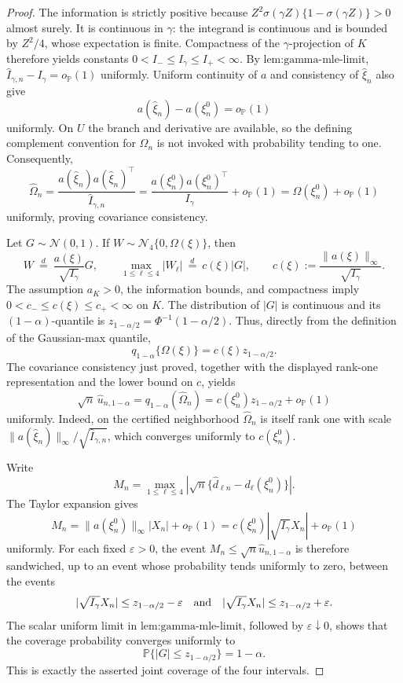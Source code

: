 \documentclass{article}
\begin{document}
\begin{proof}
The information is strictly positive because \(Z^2\sigma(\gamma Z)\{1-\sigma(\gamma Z)\}>0\) almost surely.  It is continuous in \(\gamma\): the integrand is continuous and is bounded by \(Z^2/4\), whose expectation is finite.  Compactness of the \(\gamma\)-projection of \(K\) therefore yields constants \(0<I_-\le I_\gamma\le I_+<\infty\).  By \(\text{lem:gamma-mle-limit}\), \(\widehat I_{\gamma,n}-I_\gamma=o_{\mathbb P}(1)\) uniformly.  Uniform continuity of \(a\) and consistency of \(\widehat\xi_n\) also give
\[
 a(\widehat\xi_n)-a(\xi_n^0)=o_{\mathbb P}(1)
\]
uniformly.  On \(U\) the branch and derivative are available, so the defining complement convention for \(\widehat\Omega_n\) is not invoked with probability tending to one.  Consequently,
\[
 \widehat\Omega_n
 =\frac{a(\widehat\xi_n)a(\widehat\xi_n)^\top}
        {\widehat I_{\gamma,n}}
 =\frac{a(\xi_n^0)a(\xi_n^0)^\top}{I_\gamma}
   +o_{\mathbb P}(1)
 =\Omega(\xi_n^0)+o_{\mathbb P}(1)
\]
uniformly, proving covariance consistency.

Let \(G\sim\mathcal N(0,1)\).  If \(W\sim\mathcal N_4\{0,\Omega(\xi)\}\), then
\[
 W\ \stackrel{d}{=}\ \frac{a(\xi)}{\sqrt{I_\gamma}}G,
 \qquad
 \max_{1\le\ell\le4}|W_\ell|
 \ \stackrel{d}{=}\ c(\xi)|G|,
 \qquad
 c(\xi):=\frac{\|a(\xi)\|_\infty}{\sqrt{I_\gamma}}.
\]
The assumption \(a_K>0\), the information bounds, and compactness imply
\(0<c_-\le c(\xi)\le c_+<\infty\) on \(K\).  The distribution of \(|G|\) is continuous and its \((1-\alpha)\)-quantile is \(z_{1-\alpha/2}=\Phi^{-1}(1-\alpha/2)\).  Thus, directly from the definition of the Gaussian-max quantile,
\[
 q_{1-\alpha}\{\Omega(\xi)\}=c(\xi)z_{1-\alpha/2}.
\]
The covariance consistency just proved, together with the displayed rank-one representation and the lower bound on \(c\), yields
\[
 \sqrt n\,\widehat u_{n,1-\alpha}
 =q_{1-\alpha}(\widehat\Omega_n)
 =c(\xi_n^0)z_{1-\alpha/2}+o_{\mathbb P}(1)
\]
uniformly.  Indeed, on the certified neighborhood \(\widehat\Omega_n\) is itself rank one with scale
\(\|a(\widehat\xi_n)\|_\infty/\sqrt{\widehat I_{\gamma,n}}\), which converges uniformly to \(c(\xi_n^0)\).

Write
\[
 M_n=\max_{1\le\ell\le4}
 \left|\sqrt n\{\widehat d_{\ell n}-d_\ell(\xi_n^0)\}\right|.
\]
The Taylor expansion gives
\[
 M_n=\|a(\xi_n^0)\|_\infty|X_n|+o_{\mathbb P}(1)
     =c(\xi_n^0)|\sqrt{I_\gamma}X_n|+o_{\mathbb P}(1)
\]
uniformly.  For each fixed \(\varepsilon>0\), the event
\(M_n\le\sqrt n\widehat u_{n,1-\alpha}\) is therefore sandwiched, up to an event whose probability tends uniformly to zero, between the events
\[
 |\sqrt{I_\gamma}X_n|\le z_{1-\alpha/2}-\varepsilon
 \quad\hbox{and}\quad
 |\sqrt{I_\gamma}X_n|\le z_{1-\alpha/2}+\varepsilon.
\]
The scalar uniform limit in \(\text{lem:gamma-mle-limit}\), followed by \(\varepsilon\downarrow0\), shows that the coverage probability converges uniformly to
\[
 \mathbb P\{|G|\le z_{1-\alpha/2}\}=1-\alpha.
\]
This is exactly the asserted joint coverage of the four intervals.


\end{proof}
\end{document}
